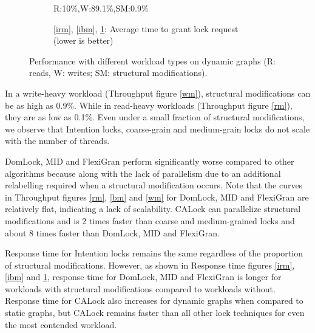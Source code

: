 \begin{figure}[h]
\begin{subfigure}[b]{.325\textwidth}
			\caption{R:10\%,W:89.1\%,SM:0.9\%}
			\label{iwm}
		\end{subfigure}
		\begin{subfigure}[b]{\textwidth}
			\caption*{\ref{irm}, \ref{ibm}, \ref{iwm}: Average time to grant lock request  (lower is better)}
		\end{subfigure}
	
		\caption{Performance with different workload types on dynamic graphs  (R: reads, W: writes; SM: structural modifications).}
		\label{dynamicPerf}
	\end{figure}

In a write-heavy workload (Throughput figure \ref{wm}), structural modifications can be as high as 0.9\%. 
While in read-heavy workloads (Throughput figure \ref{rm}), they are as low as 0.1\%.
Even under a small fraction of structural modifications, we observe that Intention locks, coarse-grain and medium-grain locks do not scale with the number of threads. 

	
DomLock, MID and FlexiGran perform significantly worse compared to other algorithms because along with the lack of parallelism due to an additional relabelling required when a structural modification occurs.
Note that the curves in Throughput figures \ref{rm}, \ref{bm} and \ref{wm} for DomLock, MID and FlexiGran are relatively flat, indicating a lack of scalability. CALock can parallelize structural modifications and is 2 times faster than coarse and medium-grained locks and about 8 times faster than DomLock, MID and FlexiGran.

Response time for Intention locks remains the same regardless of the proportion of structural modifications. However, as shown in Response time figures \ref{irm}, \ref{ibm} and \ref{iwm}, response time for DomLock, MID and FlexiGran is longer for workloads with structural modifications compared to workloads without.
Response time for CALock also increases for dynamic graphs when compared to static graphs, but CALock remains faster than all other lock techniques for even the most contended workload.




